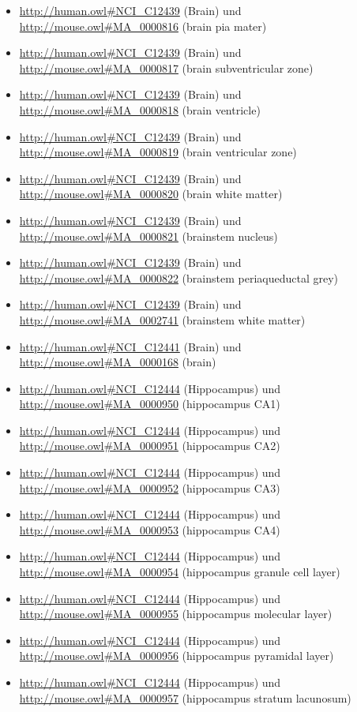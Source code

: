 \begin{itemize}
	\item \url{http://human.owl#NCI_C12439} (Brain) und \url{http://mouse.owl#MA_0000816} (brain pia mater)
	\item \url{http://human.owl#NCI_C12439} (Brain) und \url{http://mouse.owl#MA_0000817} (brain subventricular zone)
	\item \url{http://human.owl#NCI_C12439} (Brain) und \url{http://mouse.owl#MA_0000818} (brain ventricle)
	\item \url{http://human.owl#NCI_C12439} (Brain) und \url{http://mouse.owl#MA_0000819} (brain ventricular zone)
	\item \url{http://human.owl#NCI_C12439} (Brain) und \url{http://mouse.owl#MA_0000820} (brain white matter)
	\item \url{http://human.owl#NCI_C12439} (Brain) und \url{http://mouse.owl#MA_0000821} (brainstem nucleus)
	\item \url{http://human.owl#NCI_C12439} (Brain) und \url{http://mouse.owl#MA_0000822} (brainstem periaqueductal grey)
	\item \url{http://human.owl#NCI_C12439} (Brain) und \url{http://mouse.owl#MA_0002741} (brainstem white matter)
	\item \url{http://human.owl#NCI_C12441} (Brain\textunderscoreStem) und \url{http://mouse.owl#MA_0000168} (brain)
	\item \url{http://human.owl#NCI_C12444} (Hippocampus) und \url{http://mouse.owl#MA_0000950} (hippocampus CA1)
	\item \url{http://human.owl#NCI_C12444} (Hippocampus) und \url{http://mouse.owl#MA_0000951} (hippocampus CA2)
	\item \url{http://human.owl#NCI_C12444} (Hippocampus) und \url{http://mouse.owl#MA_0000952} (hippocampus CA3)
	\item \url{http://human.owl#NCI_C12444} (Hippocampus) und \url{http://mouse.owl#MA_0000953} (hippocampus CA4)
	\item \url{http://human.owl#NCI_C12444} (Hippocampus) und \url{http://mouse.owl#MA_0000954} (hippocampus granule cell layer)
	\item \url{http://human.owl#NCI_C12444} (Hippocampus) und \url{http://mouse.owl#MA_0000955} (hippocampus molecular layer)
	\item \url{http://human.owl#NCI_C12444} (Hippocampus) und \url{http://mouse.owl#MA_0000956} (hippocampus pyramidal layer)
	\item \url{http://human.owl#NCI_C12444} (Hippocampus) und \url{http://mouse.owl#MA_0000957} (hippocampus stratum lacunosum)

\end{itemize}
